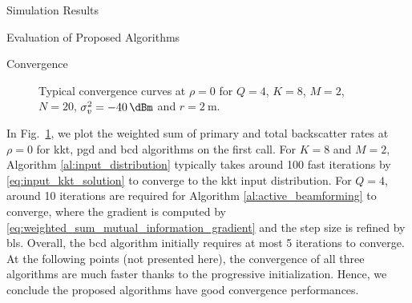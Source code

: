 \documentclass[journal,12pt,onecolumn,draftclsnofoot]{IEEEtran}
\theoremstyle{remark}
\begin{document}
\begin{section}{Simulation Results}
\begin{subsection}{Evaluation of Proposed Algorithms}
		\begin{subsubsection}{Convergence}
			\begin{figure}[!t]
				\centering
				\resizebox{0.4\columnwidth}{!}{
					
				}
				\caption{Typical convergence curves at $\rho=0$ for $Q=4$, $K=8$, $M=2$, $N=20$, $\sigma_v^2=\qty{-40}{\dBm}$ and $r=\qty{2}{\meter}$.}
				\label{fg:wsr_convergence}
			\end{figure}

			In Fig.~\ref{fg:wsr_convergence}, we plot the weighted sum of primary and total backscatter rates at $\rho=0$ for \gls{kkt}, \gls{pgd} and \gls{bcd} algorithms on the first call.
			For $K=8$ and $M=2$, Algorithm \ref{al:input_distribution} typically takes around \num{100} fast iterations by \eqref{eq:input_kkt_solution} to converge to the \gls{kkt} input distribution.
			For $Q=4$, around \num{10} iterations are required for Algorithm \ref{al:active_beamforming} to converge, where the gradient is computed by \eqref{eq:weighted_sum_mutual_information_gradient} and the step size is refined by \gls{bls}.
			Overall, the \gls{bcd} algorithm initially requires at most \num{5} iterations to converge.
			At the following points (not presented here), the convergence of all three algorithms are much faster thanks to the progressive initialization.
			Hence, we conclude the proposed algorithms have good convergence performances.
		\end{subsubsection}
	\end{subsection}


\end{section}
\end{document}

